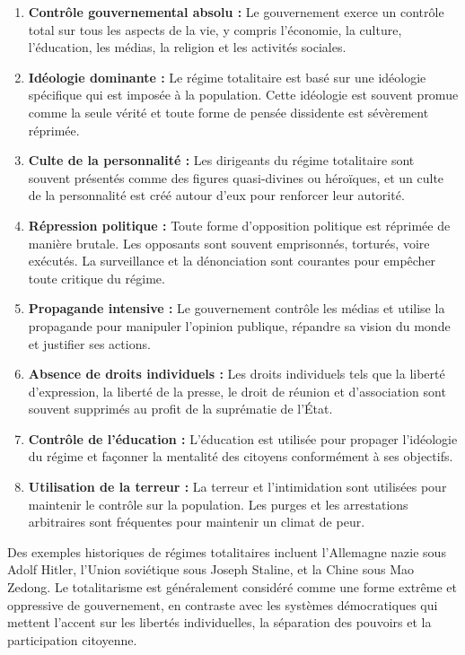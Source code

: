 \documentclass[
  letterpaper,
  DIV=11,
  numbers=noendperiod]{scrreprt}
\begin{document}
\begin{enumerate}
\def\labelenumi{\arabic{enumi}.}
\item
  \textbf{Contrôle gouvernemental absolu :} Le gouvernement exerce un
  contrôle total sur tous les aspects de la vie, y compris l'économie,
  la culture, l'éducation, les médias, la religion et les activités
  sociales.
\item
  \textbf{Idéologie dominante :} Le régime totalitaire est basé sur une
  idéologie spécifique qui est imposée à la population. Cette idéologie
  est souvent promue comme la seule vérité et toute forme de pensée
  dissidente est sévèrement réprimée.
\item
  \textbf{Culte de la personnalité :} Les dirigeants du régime
  totalitaire sont souvent présentés comme des figures quasi-divines ou
  héroïques, et un culte de la personnalité est créé autour d'eux pour
  renforcer leur autorité.
\item
  \textbf{Répression politique :} Toute forme d'opposition politique est
  réprimée de manière brutale. Les opposants sont souvent emprisonnés,
  torturés, voire exécutés. La surveillance et la dénonciation sont
  courantes pour empêcher toute critique du régime.
\item
  \textbf{Propagande intensive :} Le gouvernement contrôle les médias et
  utilise la propagande pour manipuler l'opinion publique, répandre sa
  vision du monde et justifier ses actions.
\item
  \textbf{Absence de droits individuels :} Les droits individuels tels
  que la liberté d'expression, la liberté de la presse, le droit de
  réunion et d'association sont souvent supprimés au profit de la
  suprématie de l'État.
\item
  \textbf{Contrôle de l'éducation :} L'éducation est utilisée pour
  propager l'idéologie du régime et façonner la mentalité des citoyens
  conformément à ses objectifs.
\item
  \textbf{Utilisation de la terreur :} La terreur et l'intimidation sont
  utilisées pour maintenir le contrôle sur la population. Les purges et
  les arrestations arbitraires sont fréquentes pour maintenir un climat
  de peur.
\end{enumerate}

Des exemples historiques de régimes totalitaires incluent l'Allemagne
nazie sous Adolf Hitler, l'Union soviétique sous Joseph Staline, et la
Chine sous Mao Zedong. Le totalitarisme est généralement considéré comme
une forme extrême et oppressive de gouvernement, en contraste avec les
systèmes démocratiques qui mettent l'accent sur les libertés
individuelles, la séparation des pouvoirs et la participation citoyenne.
\end{document}

